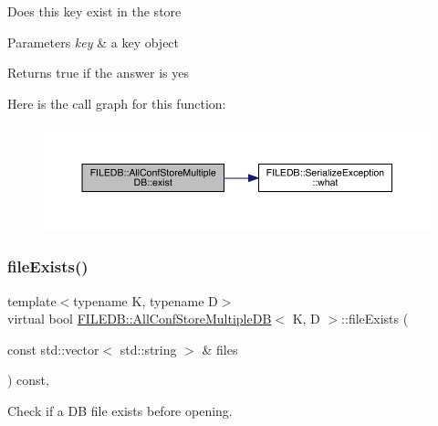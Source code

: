 Does this key exist in the store 
\begin{DoxyParams}{Parameters}
{\em key} & a key object \\
\hline
\end{DoxyParams}
\begin{DoxyReturn}{Returns}
true if the answer is yes 
\end{DoxyReturn}
Here is the call graph for this function\+:
\nopagebreak
\begin{figure}[H]
\begin{center}
\leavevmode
\includegraphics[width=350pt]{d5/dbe/classFILEDB_1_1AllConfStoreMultipleDB_a5c9333af45c37c53c863ad2a07a9843b_cgraph}
\end{center}
\end{figure}
\mbox{\label{classFILEDB_1_1AllConfStoreMultipleDB_aa5a7c38b3785226da6f30a4ab5e51428}} 
\subsubsection{\texorpdfstring{fileExists()}{fileExists()}\hspace{0.1cm}{\footnotesize\ttfamily [1/3]}}
{\footnotesize\ttfamily template$<$typename K, typename D$>$ \\
virtual bool \mbox{\hyperlink{classFILEDB_1_1AllConfStoreMultipleDB}{F\+I\+L\+E\+D\+B\+::\+All\+Conf\+Store\+Multiple\+DB}}$<$ K, D $>$\+::file\+Exists (\begin{DoxyParamCaption}\item[{const std\+::vector$<$ std\+::string $>$ \&}]{files }\end{DoxyParamCaption}) const\hspace{0.3cm}{\ttfamily [inline]}, {\ttfamily [virtual]}}

Check if a DB file exists before opening. \mbox{\label{classFILEDB_1_1AllConfStoreMultipleDB_aa5a7c38b3785226da6f30a4ab5e51428}} 
